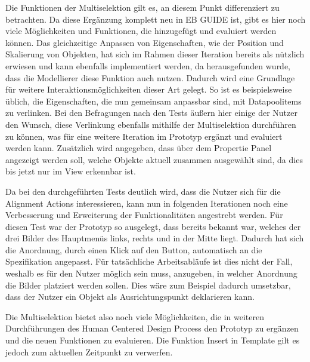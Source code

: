 Die Funktionen der Multiselektion gilt es, an diesem Punkt differenziert zu betrachten.
Da diese Ergänzung komplett neu in EB GUIDE ist, gibt es hier noch viele Möglichkeiten und Funktionen, die hinzugefügt und evaluiert werden können.
Das gleichzeitige Anpassen von Eigenschaften, wie der Position und Skalierung von Objekten, hat sich im Rahmen dieser Iteration bereits als nützlich erwiesen und kann ebenfalls implementiert werden, da herausgefunden wurde, dass die Modellierer diese Funktion auch nutzen.
Dadurch wird eine Grundlage für weitere Interaktionsmöglichkeiten dieser Art gelegt.
So ist es beispielsweise üblich, die Eigenschaften, die nun gemeinsam anpassbar sind, mit Datapoolitems zu verlinken.
Bei den Befragungen nach den Tests äußern hier einige der Nutzer den Wunsch, diese Verlinkung ebenfalls mithilfe der Multiselektion durchführen zu können, was für eine weitere Iteration im Prototyp ergänzt und evaluiert werden kann.
Zusätzlich wird angegeben, dass über dem Propertie Panel angezeigt werden soll, welche Objekte aktuell zusammen ausgewählt sind, da dies bis jetzt nur im View erkennbar ist.

Da bei den durchgeführten Tests deutlich wird, dass die Nutzer sich für die Alignment Actions interessieren, kann nun in folgenden Iterationen noch eine Verbesserung und Erweiterung der Funktionalitäten angestrebt werden.
Für diesen Test war der Prototyp so ausgelegt, dass bereits bekannt war, welches der drei Bilder des Hauptmenüs links, rechts und in der Mitte liegt.
Dadurch hat sich die Anordnung, durch einen Klick auf den Button, automatisch an die Spezifikation angepasst.
Für tatsächliche Arbeitsabläufe ist dies nicht der Fall, weshalb es für den Nutzer möglich sein muss, anzugeben, in welcher Anordnung die Bilder platziert werden sollen.
Dies wäre zum Beispiel dadurch umsetzbar, dass der Nutzer ein Objekt als Ausrichtungspunkt deklarieren kann.

Die Multiselektion bietet also noch viele Möglichkeiten, die in weiteren Durchführungen des Human Centered Design Process den Prototyp zu ergänzen und die neuen Funktionen zu evaluieren.
Die Funktion \glqq Insert in Template\grqq{} gilt es jedoch zum aktuellen Zeitpunkt zu verwerfen.